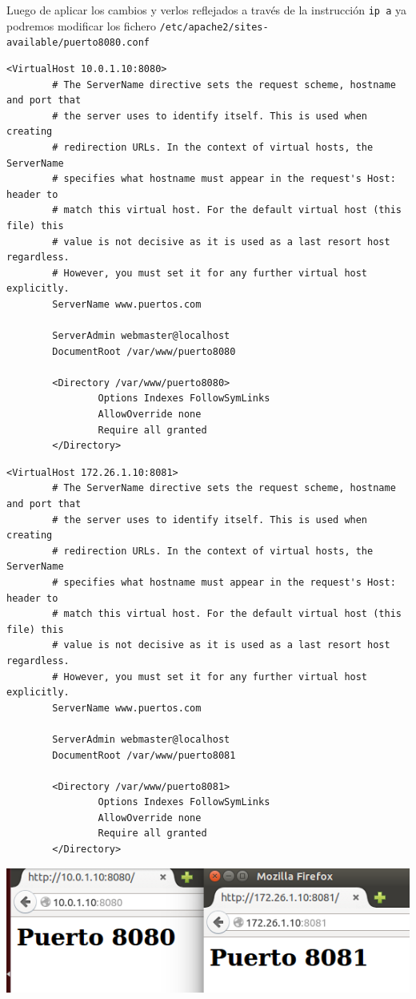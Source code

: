 \documentclass[11pt]{article}
\begin{document}
Luego de aplicar los cambios y verlos reflejados a través de la instrucción \texttt{ip a} ya podremos modificar los fichero \texttt{/etc/apache2/sites-available/puerto8080.conf}
\begin{verbatim}
<VirtualHost 10.0.1.10:8080>
        # The ServerName directive sets the request scheme, hostname and port that
        # the server uses to identify itself. This is used when creating
        # redirection URLs. In the context of virtual hosts, the ServerName
        # specifies what hostname must appear in the request's Host: header to
        # match this virtual host. For the default virtual host (this file) this
        # value is not decisive as it is used as a last resort host regardless.
        # However, you must set it for any further virtual host explicitly.
        ServerName www.puertos.com

        ServerAdmin webmaster@localhost
        DocumentRoot /var/www/puerto8080

        <Directory /var/www/puerto8080>
                Options Indexes FollowSymLinks
                AllowOverride none
                Require all granted
        </Directory>
\end{verbatim}

\begin{verbatim}
<VirtualHost 172.26.1.10:8081>
        # The ServerName directive sets the request scheme, hostname and port that
        # the server uses to identify itself. This is used when creating
        # redirection URLs. In the context of virtual hosts, the ServerName
        # specifies what hostname must appear in the request's Host: header to
        # match this virtual host. For the default virtual host (this file) this
        # value is not decisive as it is used as a last resort host regardless.
        # However, you must set it for any further virtual host explicitly.
        ServerName www.puertos.com

        ServerAdmin webmaster@localhost
        DocumentRoot /var/www/puerto8081

        <Directory /var/www/puerto8081>
                Options Indexes FollowSymLinks
                AllowOverride none
                Require all granted
        </Directory>
\end{verbatim}

\begin{center}
\includegraphics[width=.9\linewidth]{./media/apache-8.png}
\end{center}
\end{document}
